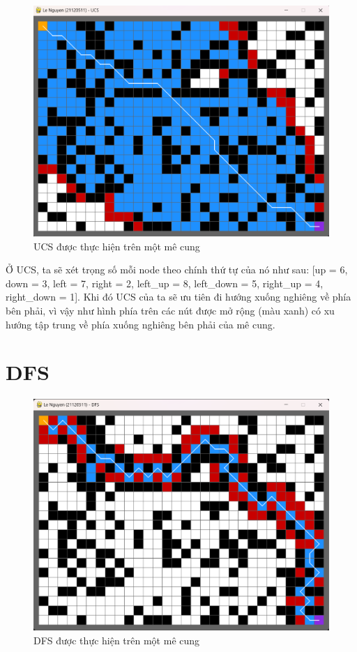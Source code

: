\begin{figure}[H]
    \centering
    \includegraphics[scale=0.7]{figure/Implementation/UCS.png}
    \caption{UCS được thực hiện trên một mê cung}
    \label{fig:imple_UCS}
\end{figure}

Ở UCS, ta sẽ xét trọng số mỗi node theo chính thứ tự của nó như sau: [up = 6, down = 3, left = 7, right = 2, left\_up = 8, left\_down = 5, right\_up = 4, right\_down = 1]. Khi đó UCS của ta sẽ ưu tiên đi hướng xuống nghiêng về phía bên phải, vì vậy như hình phía trên các nút được mở rộng (màu xanh) có xu hướng tập trung về phía xuống nghiêng bên phải của mê cung.

\section{DFS}

\begin{figure}[H]
    \centering
    \includegraphics[scale=0.7]{figure/Implementation/DFS.png}
    \caption{DFS được thực hiện trên một mê cung}
    \label{fig:imple_DFS}
\end{figure}

